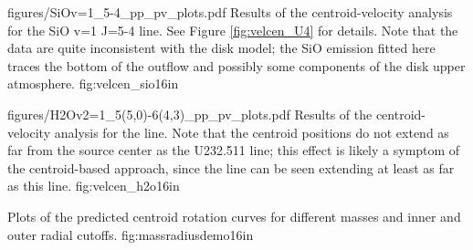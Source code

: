 \documentclass[twocolumn]{aastex61}
\begin{document}
\Figure
{figures/SiOv=1_5-4_pp_pv_plots.pdf}
{Results of the centroid-velocity analysis for the SiO v=1 J=5-4 line.
See Figure \ref{fig:velcen_U4} for details.
Note that the data are quite inconsistent with the disk model;
the SiO emission fitted here traces the bottom of the outflow
and possibly some components of the disk upper atmosphere.
}
{fig:velcen_sio}{1}{6in}

\Figure
{figures/H2Ov2=1_5(5,0)-6(4,3)_pp_pv_plots.pdf}
{Results of the centroid-velocity analysis for the \water line.
Note that the centroid positions do not extend as far from
the source center as the U232.511 line; this effect is likely
a symptom of the centroid-based approach, since the \water
line can be seen extending at least as far as this line.
}
{fig:velcen_h2o}{1}{6in}

{Plots of the predicted centroid rotation curves for different masses
and inner and outer radial cutoffs.}
{fig:massradiusdemo}{1}{6in}
\end{document}

